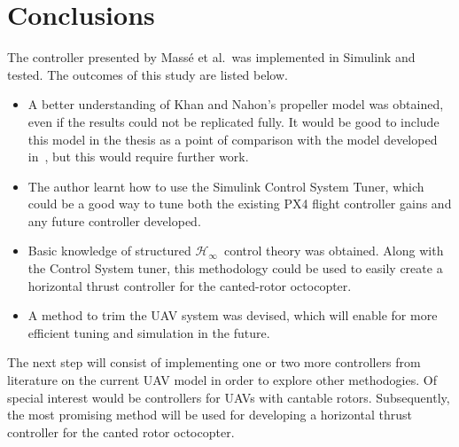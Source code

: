 \documentclass[a4paper,12pt]{article}
\newcommand{\hinf}{\mathcal{H}_\infty}
\newcommand{\Hinf}{\(\hinf\)}
\begin{document}
    \newpage
    \section{Conclusions}

        The controller presented by Mass{\'e} et al.\ was implemented in Simulink and tested. The outcomes of this study are listed below.

        \begin{itemize}
            \item A better understanding of Khan and Nahon's propeller model was obtained, even if the results could not be replicated fully. It would be good to include this model in the thesis as a point of comparison with the model developed in~\cite{BannwarthEtAl2018}, but this would require further work.
            \item The author learnt how to use the Simulink Control System Tuner, which could be a good way to tune both the existing PX4 flight controller gains and any future controller developed.
            \item Basic knowledge of structured \Hinf\ control theory was obtained. Along with the Control System tuner, this methodology could be used to easily create a horizontal thrust controller for the canted-rotor octocopter.
            \item A method to trim the UAV system was devised, which will enable for more efficient tuning and simulation in the future.
        \end{itemize}

        The next step will consist of implementing one or two more controllers from literature on the current UAV model in order to explore other methodogies. Of special interest would be controllers for UAVs with cantable rotors. Subsequently, the most promising method will be used for developing a horizontal thrust controller for the canted rotor octocopter.

    
    
\end{document}
